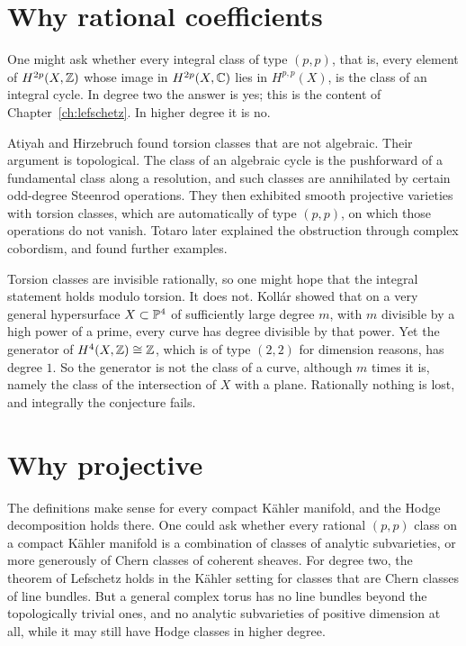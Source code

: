 \section{Why rational coefficients}

One might ask whether every integral class of type $(p,p)$, that is, every
element of $H^{2p}(X,\mathbb{Z})$ whose image in $H^{2p}(X,\mathbb{C})$ lies in
$H^{p,p}(X)$, is the class of an integral cycle. In degree two the answer is
yes; this is the content of Chapter~\ref{ch:lefschetz}. In higher degree it
is no.

Atiyah and Hirzebruch \cite{AH62} found torsion classes that are not
algebraic. Their argument is topological. The class of an algebraic cycle
is the pushforward of a fundamental class along a resolution, and such
classes are annihilated by certain odd-degree Steenrod operations. They
then exhibited smooth projective varieties with torsion classes, which are
automatically of type $(p,p)$, on which those operations do not vanish.
Totaro \cite{Tot97} later explained the obstruction through complex
cobordism, and found further examples.

Torsion classes are invisible rationally, so one might hope that the
integral statement holds modulo torsion. It does not. Koll\'ar
\cite{Kol92} showed that on a very general hypersurface $X\subset\mathbb{P}^{4}$
of sufficiently large degree $m$, with $m$ divisible by a high power of a
prime, every curve has degree divisible by that power. Yet the generator of
$H^{4}(X,\mathbb{Z})\cong\mathbb{Z}$, which is of type $(2,2)$ for dimension reasons, has
degree $1$. So the generator is not the class of a curve, although $m$
times it is, namely the class of the intersection of $X$ with a plane. Rationally
nothing is lost, and integrally the conjecture fails.

\section{Why projective}

The definitions make sense for every compact K\"ahler manifold, and the
Hodge decomposition holds there. One could ask whether every rational
$(p,p)$ class on a compact K\"ahler manifold is a combination of classes
of analytic subvarieties, or more generously of Chern classes of coherent
sheaves. For degree two, the theorem of Lefschetz holds in the K\"ahler
setting for classes that are Chern classes of line bundles. But a general
complex torus has no line bundles beyond the topologically trivial ones,
and no analytic subvarieties of positive dimension at all, while it may
still have Hodge classes in higher degree.

